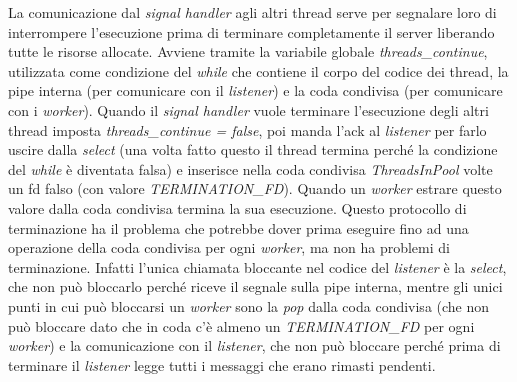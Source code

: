 \documentclass[a4paper]{article}
\theoremstyle{theorem}
\theoremstyle{remark}
\theoremstyle{definition}
\theoremstyle{corollary}
\theoremstyle{lemma}
\newcommand\codeName[1]{%
	\textit{#1}}
\begin{document}
La comunicazione dal \codeName{signal handler} agli altri thread serve per segnalare loro di interrompere l'esecuzione prima di terminare completamente il server liberando tutte le risorse allocate. Avviene tramite la variabile globale \codeName{threads\_continue}, utilizzata come condizione del \codeName{while} che contiene il corpo del codice dei thread, la pipe interna (per comunicare con il \codeName{listener}) e la coda condivisa (per comunicare con i \codeName{worker}). Quando il \codeName{signal handler} vuole terminare l'esecuzione degli altri thread imposta \codeName{threads\_continue = false}, poi manda l'ack al \codeName{listener} per farlo uscire dalla \codeName{select} (una volta fatto questo il thread termina perché la condizione del \codeName{while} è diventata falsa) e inserisce nella coda condivisa \codeName{ThreadsInPool} volte un fd falso (con valore \codeName{TERMINATION\_FD}). Quando un \codeName{worker} estrare questo valore dalla coda condivisa termina la sua esecuzione.
Questo protocollo di terminazione ha il problema che potrebbe dover prima eseguire fino ad una operazione della coda condivisa per ogni \codeName{worker}, ma non ha problemi di terminazione. Infatti l'unica chiamata bloccante nel codice del \codeName{listener} è la \codeName{select}, che non può bloccarlo perché riceve il segnale sulla pipe interna, mentre gli unici punti in cui può bloccarsi un \codeName{worker} sono la \codeName{pop} dalla coda condivisa (che non può bloccare dato che in coda c'è almeno un \codeName{TERMINATION\_FD} per ogni \codeName{worker}) e la comunicazione con il \codeName{listener}, che non può bloccare perché prima di terminare il \codeName{listener} legge tutti i messaggi che erano rimasti pendenti.
\end{document}
